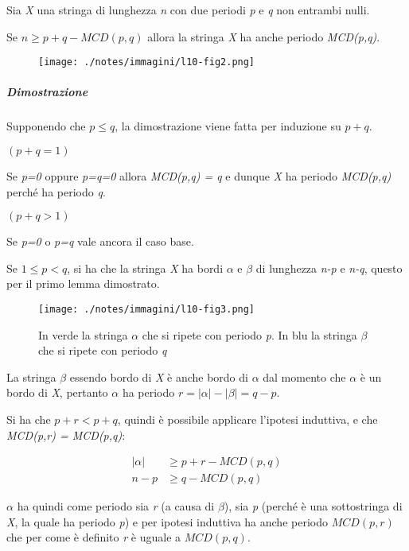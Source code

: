 Sia \emph{X} una stringa di lunghezza \emph{n} con due periodi \emph{p}
e \emph{q} non entrambi nulli.

Se $n \geq p + q - MCD(p,q)$ allora la stringa \emph{X} ha anche periodo \emph{MCD(p,q)}.

\begin{figure}[htbp]
\centering
\texttt{[image: ./notes/immagini/l10-fig2.png]}
\caption{}
\end{figure}

\subparagraph{Dimostrazione}\label{dimostrazione-2}

Supponendo che $p \leq q$, la dimostrazione viene fatta per induzione su $p+q$.

$(p+q = 1)$ 

Se \emph{p=0} oppure \emph{p=q=0} allora \emph{MCD(p,q) = q} e dunque
\emph{X} ha periodo \emph{MCD(p,q)} perché ha periodo \emph{q}.

$(p+q > 1)$

Se \emph{p=0} o \emph{p=q} vale ancora il caso base.

Se $1 \leq p < q$, si ha che la stringa \emph{X} ha bordi $\alpha$ e $\beta$ di lunghezza \emph{n-p} e \emph{n-q}, questo per il primo lemma dimostrato.

\begin{figure}[htbp]
\centering
\texttt{[image: ./notes/immagini/l10-fig3.png]}
\caption{In verde la stringa $\alpha$ che si ripete con periodo
\emph{p}. In blu la stringa $\beta$ che si ripete con periodo
\emph{q}}
\end{figure}

La stringa $\beta$ essendo bordo di \emph{X} è anche bordo di $\alpha$ dal momento che $\alpha$ è un bordo di \emph{X}, pertanto $\alpha$ ha periodo $r = |\alpha| - |\beta| = q -p$.

Si ha che $p+r < p + q$, quindi è possibile applicare l'ipotesi induttiva, e che \emph{MCD(p,r) = MCD(p,q)}:

\begin{align*}
|\alpha| &\geq p+r-MCD(p,q)\\
 n - p &\geq q - MCD(p,q) 
\end{align*}

$ \alpha $ ha quindi come periodo sia \textit{r} (a causa di $ \beta $), sia \textit{p} (perché è una sottostringa di \textit{X}, la quale ha periodo \textit{p}) e per ipotesi induttiva ha anche periodo $MCD(p,r)$ che per come è definito \textit{r} è uguale a $MCD(p,q)$.

